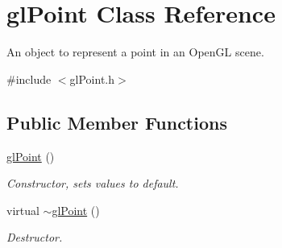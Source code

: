 \hypertarget{classgl_point}{
\section{glPoint Class Reference}
\label{classgl_point}
}


An object to represent a point in an OpenGL scene.  




{\ttfamily \#include $<$glPoint.h$>$}

\subsection*{Public Member Functions}
\begin{DoxyCompactItemize}
\item 
\hyperlink{classgl_point_aff01f3dd45e84e05f3d1347f10c851ab}{glPoint} ()
\begin{DoxyCompactList}\small\item\em Constructor, sets values to default. \end{DoxyCompactList}\item 
\hypertarget{classgl_point_a0dca424b71a378b655d0220f127d2b61}{
virtual \hyperlink{classgl_point_a0dca424b71a378b655d0220f127d2b61}{$\sim$glPoint} ()}
\label{classgl_point_a0dca424b71a378b655d0220f127d2b61}

\begin{DoxyCompactList}\small\item\em Destructor. \end{DoxyCompactList}\end{DoxyCompactItemize}
